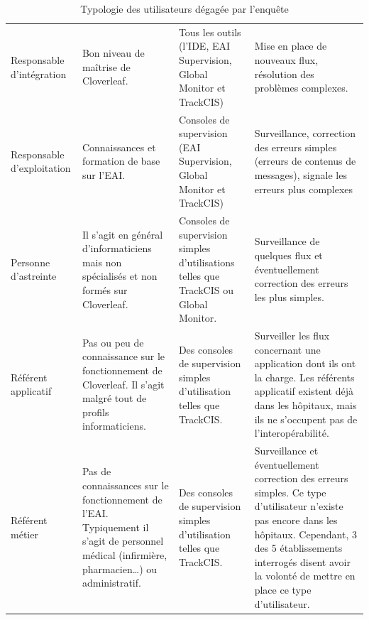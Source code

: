 			\begin{table}[H]
				\centering
				\caption{\label{type_utilisateurs} Typologie des utilisateurs dégagée par
				l'enquête}
				\begin{tabular}{| p{3cm} | p{4cm} | p{4,5cm} | p{} |}
					\hline
						\thead{Utilisateur}
						&\thead{Niveau de maîtrise}
						&\thead{Outils utilisés}
						&\thead{Rôles}
						\\
					\hline
						Responsable d'intégration
						&
						Bon niveau de maîtrise de Cloverleaf.
						&
						Tous les outils (l'IDE, EAI Supervision, Global Monitor et TrackCIS)
						&
						Mise en place de nouveaux flux, résolution des problèmes complexes.
						\\
					\hline
						Responsable d'exploitation
						&
						Connaissances et formation de base sur l’EAI.
						&
						Consoles de supervision (EAI Supervision, Global Monitor et TrackCIS)
						&
						Surveillance, correction des erreurs simples (erreurs de contenus de
						messages), signale les erreurs plus complexes
						\\
					\hline
						Personne d'astreinte
						&
						Il s'agit en général d'informaticiens mais non spécialisés et non formés
						sur Cloverleaf.
						&
						Consoles de supervision simples d'utilisations telles que TrackCIS ou
						Global Monitor.
						&
						Surveillance de quelques flux et éventuellement correction des erreurs les
						plus simples.
						\\
					\hline
						Référent applicatif
						&
						Pas ou peu de connaissance sur le fonctionnement de Cloverleaf. Il s'agit
						malgré tout de profils informaticiens.
						&
						Des consoles de supervision simples d'utilisation telles que TrackCIS.
						&
						Surveiller les flux concernant une application dont ils ont la charge. Les
						référents applicatif existent déjà dans les hôpitaux, mais ils ne
						s'occupent pas de l'interopérabilité.
						\\
					\hline
						Référent métier
						&
						Pas de connaissances sur le fonctionnement de l’EAI. Typiquement il s'agit
						de personnel médical (infirmière, pharmacien\ldots) ou administratif.
						&
						Des consoles de supervision simples d'utilisation telles que TrackCIS.
						&
						Surveillance et éventuellement correction des erreurs simples. Ce type
						d'utilisateur n'existe pas encore dans les hôpitaux. Cependant, 3 des 5
						établissements interrogés disent avoir la volonté de mettre en place ce
						type d'utilisateur.
						\\
					\hline
				\end{tabular}
			\end{table}
